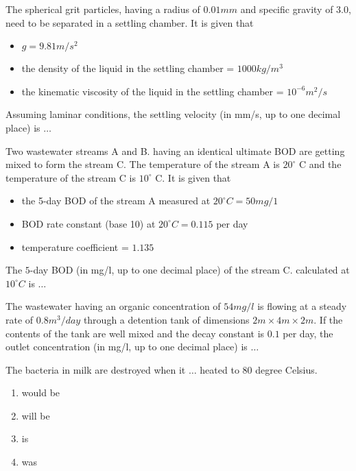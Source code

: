 \iffalse
	\chapter{2017}
	\author{AI24BTECH11001}
	\section{ce}
\fi	
    \item The spherical grit particles, having a radius of $0.01 mm$ and specific gravity of $3.0$, need to be separated in a settling chamber. It is given that
    \begin{itemize}
        \item $g = 9.81 m/s^2$
        \item the density of the liquid in the settling chamber = $1000 kg/m^3$
        \item the kinematic viscosity of the liquid in the settling chamber = $10^{-6} m^2/s$
    \end{itemize}
    Assuming laminar conditions, the settling velocity (in mm/s, up to one decimal place) is $\dots$

    \item Two wastewater streams A and B. having an identical ultimate BOD are getting mixed to form the stream C. The temperature of the stream A is $20^\circ$ C and the temperature of the stream C is $10^\circ$ C. It is given that
    \begin{itemize}
        \item the 5-day BOD of the stream A measured at $20^\circ C = 50 mg/1$
        \item BOD rate constant (base 10) at $20^\circ C = 0.115$ per day
        \item temperature coefficient = $1.135$
    \end{itemize}
    The $5$-day BOD (in mg/l, up to one decimal place) of the stream C. calculated at $10^\circ C$ is $\dots$

    \item The wastewater having an organic concentration of $54 mg/l$ is flowing at a steady rate of $0.8 m^3/day$ through a detention tank of dimensions $2 m \times 4 m \times 2 m$. If the contents of the tank are well mixed and the decay constant is $0.1$ per day, the outlet concentration (in mg/l, up to one decimal place) is $\dots$

    \item The bacteria in milk are destroyed when it $\dots$ heated to $80$ degree Celsius.
    \begin{multicols}{4}
        \begin{enumerate}
            \item would be
            \item will be
            \item is
            \item was
        \end{enumerate}
    \end{multicols}

